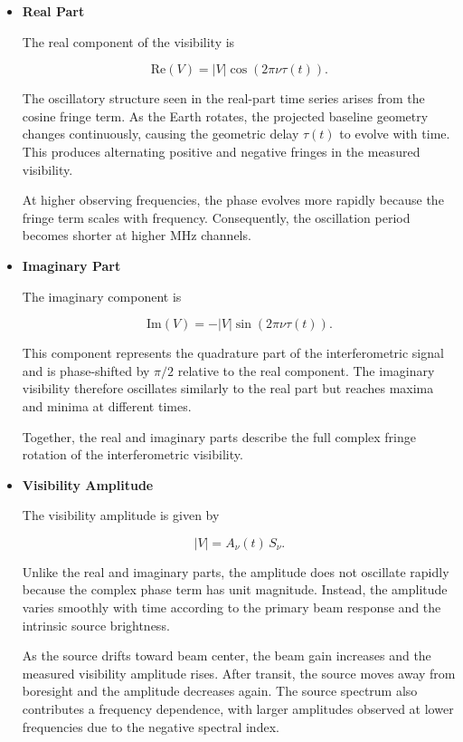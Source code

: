 \documentclass{article}
\begin{document}
\begin{itemize}

\item \textbf{Real Part}

The real component of the visibility is

\begin{equation}
\mathrm{Re}(V)
=
|V|
\cos(2\pi\nu\tau(t)).
\end{equation}

The oscillatory structure seen in the real-part time series arises from the cosine fringe term. As the Earth rotates, the projected baseline geometry changes continuously, causing the geometric delay $\tau(t)$ to evolve with time. This produces alternating positive and negative fringes in the measured visibility.

At higher observing frequencies, the phase evolves more rapidly because the fringe term scales with frequency. Consequently, the oscillation period becomes shorter at higher MHz channels.

\item \textbf{Imaginary Part}

The imaginary component is

\begin{equation}
\mathrm{Im}(V)
=
-|V|
\sin(2\pi\nu\tau(t)).
\end{equation}

This component represents the quadrature part of the interferometric signal and is phase-shifted by $\pi/2$ relative to the real component. The imaginary visibility therefore oscillates similarly to the real part but reaches maxima and minima at different times.

Together, the real and imaginary parts describe the full complex fringe rotation of the interferometric visibility.

\item \textbf{Visibility Amplitude}

The visibility amplitude is given by

\begin{equation}
|V|
=
A_\nu(t)\, S_\nu.
\end{equation}

Unlike the real and imaginary parts, the amplitude does not oscillate rapidly because the complex phase term has unit magnitude. Instead, the amplitude varies smoothly with time according to the primary beam response and the intrinsic source brightness.

As the source drifts toward beam center, the beam gain increases and the measured visibility amplitude rises. After transit, the source moves away from boresight and the amplitude decreases again. The source spectrum also contributes a frequency dependence, with larger amplitudes observed at lower frequencies due to the negative spectral index.


\end{itemize}
\end{document}
